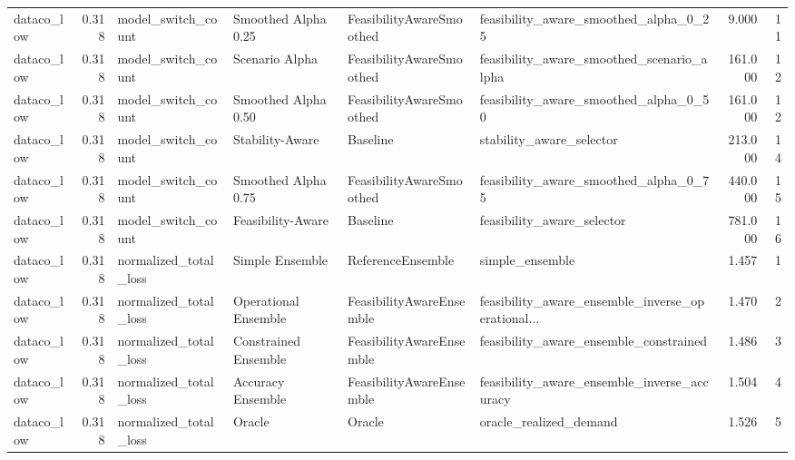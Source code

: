 \begin{table}
{\begin{tabular}{lrllllrr}
    dataco\_low &             0.318 &          model\_switch\_count &   Smoothed Alpha 0.25 &  FeasibilityAwareSmoothed &              feasibility\_aware\_smoothed\_alpha\_0\_25 &         9.000 &              11 \\
    dataco\_low &             0.318 &          model\_switch\_count &        Scenario Alpha &  FeasibilityAwareSmoothed &          feasibility\_aware\_smoothed\_scenario\_alpha &       161.000 &              12 \\
    dataco\_low &             0.318 &          model\_switch\_count &   Smoothed Alpha 0.50 &  FeasibilityAwareSmoothed &              feasibility\_aware\_smoothed\_alpha\_0\_50 &       161.000 &              12 \\
    dataco\_low &             0.318 &          model\_switch\_count &       Stability-Aware &                  Baseline &                           stability\_aware\_selector &       213.000 &              14 \\
    dataco\_low &             0.318 &          model\_switch\_count &   Smoothed Alpha 0.75 &  FeasibilityAwareSmoothed &              feasibility\_aware\_smoothed\_alpha\_0\_75 &       440.000 &              15 \\
    dataco\_low &             0.318 &          model\_switch\_count &     Feasibility-Aware &                  Baseline &                         feasibility\_aware\_selector &       781.000 &              16 \\
    dataco\_low &             0.318 &       normalized\_total\_loss &       Simple Ensemble &         ReferenceEnsemble &                                    simple\_ensemble &         1.457 &               1 \\
    dataco\_low &             0.318 &       normalized\_total\_loss &  Operational Ensemble &  FeasibilityAwareEnsemble &  feasibility\_aware\_ensemble\_inverse\_operational... &         1.470 &               2 \\
    dataco\_low &             0.318 &       normalized\_total\_loss &  Constrained Ensemble &  FeasibilityAwareEnsemble &             feasibility\_aware\_ensemble\_constrained &         1.486 &               3 \\
    dataco\_low &             0.318 &       normalized\_total\_loss &     Accuracy Ensemble &  FeasibilityAwareEnsemble &        feasibility\_aware\_ensemble\_inverse\_accuracy &         1.504 &               4 \\
    dataco\_low &             0.318 &       normalized\_total\_loss &                Oracle &                    Oracle &                             oracle\_realized\_demand &         1.526 &               5 \\

\end{tabular}}
\end{table}
